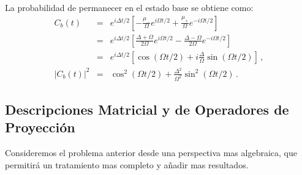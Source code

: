 \documentclass[twocolumn,aps,eqsecnum]{revtex4}
\begin{document}
La probabilidad de permanecer en el estado base se obtiene como: 
%
\begin{eqnarray} 
C_b (t) &=& e^{i \Delta t/2} 
	\left[ - \frac{\mu_-}{\Omega}  e^{i \Omega t/2} 
	 + \frac{\mu_+}{\Omega}   e^{-i \Omega t/2} \right]  	\nonumber \\ 
&=& e^{i \Delta t/2} \left[ \frac{\Delta +\Omega}{2\Omega} e^{i \Omega t/2} 
	 - \frac{\Delta -\Omega}{2\Omega}   e^{-i \Omega t/2} \right] 
	 \nonumber \\ 
&=& e^{i \Delta t/2} \left[ \cos{(\Omega t/2)} 
	+ i \frac{\Delta}{\Omega} \sin{(\Omega t/2)} \right] \,, \nonumber \\ 
|C_b (t)|^2 &=& \cos^2{(\Omega t/2)} 
	+ \frac{\Delta^2}{\Omega^2} \sin^2{(\Omega t/2)}  \,.
\end{eqnarray}

\subsection{Descripciones Matricial y de Operadores de Proyecci\'on}
Consideremos el problema anterior desde una perspectiva mas algebraica, 
que permitir\'a un tratamiento mas completo y a\~nadir mas resultados. 
\end{document}
